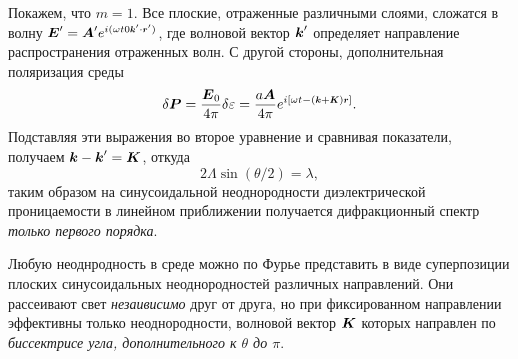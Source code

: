 Покажем, что $m=1$. Все плоские, отраженные различными слоями, сложатся в волну $\vc{E}' = \vc{A}' e^{i(\omega t 0 \smallvc{k}' \cdot \smallvc{r}')}$, где волновой вектор $\mbox{\boldmath $k$}'$ определяет направление распространения отраженных волн. С другой стороны, дополнительная поляризация среды
\begin{equation*}
    \delta \vc{P} = \frac{\vc{E}_0}{4 \pi} \delta \varepsilon = \frac{a \vc{A}}{4 \pi} e^{i[\omega t - \left(\smallvc{k}+\smallvc{K}\right)\smallvc{r}]}.
\end{equation*}
Подставляя эти выражения во второе уравнение и сравнивая показатели, получаем $\mbox{\boldmath $k$} - \mbox{\boldmath $k$}' = \mbox{\boldmath $K$}$, откуда
\begin{equation*}
    2 \Lambda \sin(\theta/2) = \lambda,
\end{equation*}
таким образом на синусоидальной неоднородности диэлектрической проницаемости в линейном приближении получается дифракционный спектр \textit{только первого порядка}. 

Любую неоднродность в среде можно по Фурье представить в виде суперпозиции плоских синусоидальных неоднородностей различных направлений. Они рассеивают свет \textit{незаивисимо} друг от друга, но при фиксированном направлении эффективны только неоднородности,  волновой вектор $\mbox{\boldmath $K$}$ которых направлен по \textit{биссектрисе угла, дополнительного к $\theta$ до $\pi$}.



